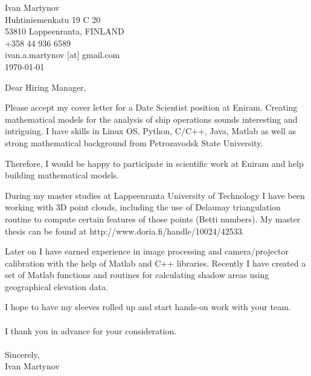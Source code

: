 \documentclass[]{article}
\begin{document}
\begin{flushright}
	Ivan Martynov\\
  Huhtiniemenkatu 19 C 20\\
	53810 Lappeenranta, FINLAND\\
	+358 44 936 6589\\
	ivan.a.martynov [at] gmail.com\\
	\today
\end{flushright}



\noindent
Dear Hiring Manager,
\bigskip

Please accept my cover letter for a Date Scientist position at Eniram.  Creating
mathematical models for the analysis of ship operations sounds interesting and
intriguing. I have skills in Linux OS, Python, C/C++, Java, Matlab as well as
strong mathematical background from Petrozavodsk State University.

Therefore, I would be happy to participate in scientific work at Eniram and
help building mathematical models.

During my master studies at Lappeenranta University of Technology I have been
working with 3D point clouds, including the use of Delaunay triangulation
routine to compute certain features of those points (Betti numbers). My master
thesis can be found at http://www.doria.fi/handle/10024/42533.

Later on I have earned experience in image processing and camera/projector
calibration with the help of Matlab and C++ libraries. Recently I have created
a set of Matlab functions and routines for calculating shadow areas using
geographical elevation data.

I hope to have my sleeves rolled up and start hands-on work with your team.
\\\ \\

\noindent
I thank you in advance for your consideration.\\\ \\

\noindent Sincerely,\\
Ivan Martynov
\end{document}
